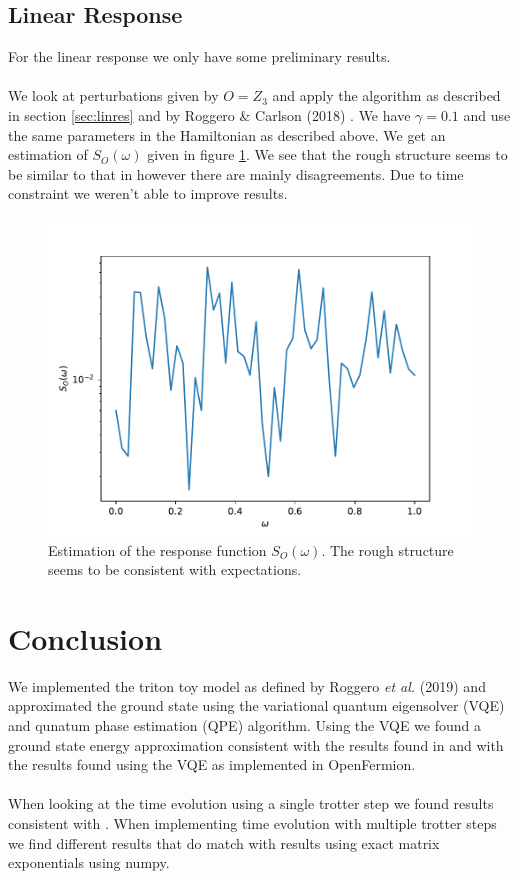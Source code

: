 \documentclass[10 pt, a4paper]{article}
\begin{document}
\subsection{Linear Response}

For the linear response we only have some preliminary results.
\\
\\
We look at perturbations given by $O = Z_3$ and apply the algorithm as described in section \ref{sec:linres} and by Roggero \& Carlson (2018) \cite{linres}. We have $\gamma = 0.1$ and use the same parameters in the Hamiltonian as described above. We get an estimation of $S_O(\omega)$ given in figure \ref{fig:SO}. We see that the rough structure seems to be similar to that in \cite{linres} however there are mainly disagreements. Due to time constraint we weren't able to improve results.

\begin{figure}[H]
\centering
	\includegraphics[width=0.7\linewidth]{SO}
\caption{Estimation of the response function $S_O(\omega)$. The rough structure seems to be consistent with expectations.}  \label{fig:SO}
\end{figure}

\section{Conclusion}

We implemented the triton toy model as defined by Roggero \textit{et al.} (2019) \cite{neutscat} and approximated the ground state using the variational quantum eigensolver (VQE) and qunatum phase estimation (QPE) algorithm. Using the VQE we found a ground state energy approximation consistent with the results found in \cite{neutscat} and with the results found using the VQE as implemented in OpenFermion.
\\
\\
When looking at the time evolution using a single trotter step we found results consistent with \cite{neutscat}. When implementing time evolution with multiple trotter steps we find different results that do match with results using exact matrix exponentials using numpy.
\end{document}
